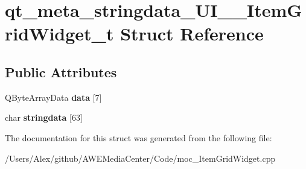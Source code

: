 \hypertarget{structqt__meta__stringdata___u_i_____item_grid_widget__t}{\section{qt\-\_\-meta\-\_\-stringdata\-\_\-\-U\-I\-\_\-\-\_\-\-Item\-Grid\-Widget\-\_\-t Struct Reference}
\label{structqt__meta__stringdata___u_i_____item_grid_widget__t}
}
\subsection*{Public Attributes}
\begin{DoxyCompactItemize}
\item 
\hypertarget{structqt__meta__stringdata___u_i_____item_grid_widget__t_ab227e872c002a8e79de9f35a89156649}{Q\-Byte\-Array\-Data {\bfseries data} \mbox{[}7\mbox{]}}\label{structqt__meta__stringdata___u_i_____item_grid_widget__t_ab227e872c002a8e79de9f35a89156649}

\item 
\hypertarget{structqt__meta__stringdata___u_i_____item_grid_widget__t_ac345632994697605ab357be98a502a16}{char {\bfseries stringdata} \mbox{[}63\mbox{]}}\label{structqt__meta__stringdata___u_i_____item_grid_widget__t_ac345632994697605ab357be98a502a16}

\end{DoxyCompactItemize}


The documentation for this struct was generated from the following file\-:\begin{DoxyCompactItemize}
\item 
/\-Users/\-Alex/github/\-A\-W\-E\-Media\-Center/\-Code/moc\-\_\-\-Item\-Grid\-Widget.\-cpp\end{DoxyCompactItemize}
